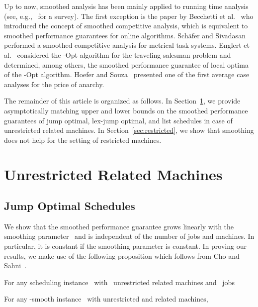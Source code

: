 \documentclass[a4paper,11pt,fleqn]{article}
\begin{document}
Up to now, smoothed analysis has been mainly applied to running time
analysis (see, e.g.,~\cite{Spielman+Teng:CACM2009} for a survey). The first
exception is the paper by Becchetti et
al.~\cite{Becchetti+etal:Smoothed:MOR} who introduced the concept of
smoothed competitive analysis, which is equivalent to smoothed performance
guarantees for online algorithms. Sch\"afer and
Sivadasan~\cite{Schaefer+Sivadasan:2005} performed a smoothed
competitive analysis for metrical task systems. Englert et al.~\cite{Englert+etal:SODA2007} considered the -Opt algorithm for the traveling salesman problem and determined, among others, the
smoothed performance guarantee of local optima of the -Opt algorithm.
Hoefer and Souza~\cite{Hoefer+Souza:2010} presented one of the first
average case analyses for the price of anarchy.


The remainder of this article is organized as follows.
In Section~\ref{sec:relatedmachines}, we
provide asymptotically matching upper and lower bounds on the smoothed performance guarantees of
jump optimal,  lex-jump optimal, and list schedules in case of unrestricted related machines. In Section~\ref{sec:restricted}, we show that smoothing does not help for the setting of restricted machines.




\section{Unrestricted Related Machines}
\label{sec:relatedmachines}

\subsection{Jump Optimal Schedules}
\label{subsec:jump}


We show that the smoothed performance guarantee grows
linearly with the smoothing parameter~ and is independent
of the number of jobs and machines. In particular, it is constant if the
smoothing parameter is constant. In proving our results, we make use of the 
following proposition which follows from Cho and Sahni~\cite{Cho+Sahni:1980}.

\begin{prop}
For any scheduling instance~ with~ unrestricted related machines and~ jobs

\label{prop:ChoSahni}
\end{prop}

\begin{theorem}
\label{thm:JumpRelatedUpper}
For any -smooth instance~ with unrestricted and related machines,

\end{theorem}
\end{document}

